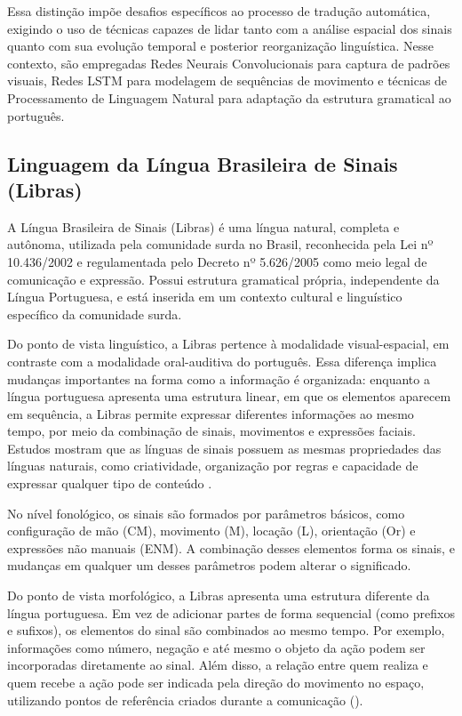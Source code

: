 \documentclass[
    12pt,                %
    openright,           %
    oneside,             %
    a4paper,             %
    english,             %
    brazil               %
]{abntex2}
\begin{document}
Essa distinção impõe desafios específicos ao processo de tradução automática, exigindo o uso de técnicas capazes de lidar tanto com a análise espacial dos sinais quanto com sua evolução temporal e posterior reorganização linguística. Nesse contexto, são empregadas Redes Neurais Convolucionais para captura de padrões visuais, Redes LSTM para modelagem de sequências de movimento e técnicas de Processamento de Linguagem Natural para adaptação da estrutura gramatical ao português.


\subsection{Linguagem da Língua Brasileira de Sinais (Libras)}

A Língua Brasileira de Sinais (Libras) é uma língua natural, completa e autônoma, utilizada pela comunidade surda no Brasil, reconhecida pela Lei nº 10.436/2002 e regulamentada pelo Decreto nº 5.626/2005 como meio legal de comunicação e expressão. Possui estrutura gramatical própria, independente da Língua Portuguesa, e está inserida em um contexto cultural e linguístico específico da comunidade surda.

Do ponto de vista linguístico, a Libras pertence à modalidade visual-espacial, em contraste com a modalidade oral-auditiva do português. Essa diferença implica mudanças importantes na forma como a informação é organizada: enquanto a língua portuguesa apresenta uma estrutura linear, em que os elementos aparecem em sequência, a Libras permite expressar diferentes informações ao mesmo tempo, por meio da combinação de sinais, movimentos e expressões faciais. Estudos mostram que as línguas de sinais possuem as mesmas propriedades das línguas naturais, como criatividade, organização por regras e capacidade de expressar qualquer tipo de conteúdo \cite{Quadros2004}.

No nível fonológico, os sinais são formados por parâmetros básicos, como configuração de mão (CM), movimento (M), locação (L), orientação (Or) e expressões não manuais (ENM). A combinação desses elementos forma os sinais, e mudanças em qualquer um desses parâmetros podem alterar o significado.

Do ponto de vista morfológico, a Libras apresenta uma estrutura diferente da língua portuguesa. Em vez de adicionar partes de forma sequencial (como prefixos e sufixos), os elementos do sinal são combinados ao mesmo tempo. Por exemplo, informações como número, negação e até mesmo o objeto da ação podem ser incorporadas diretamente ao sinal. Além disso, a relação entre quem realiza e quem recebe a ação pode ser indicada pela direção do movimento no espaço, utilizando pontos de referência criados durante a comunicação (\cite{Quadros2004}).
\end{document}
